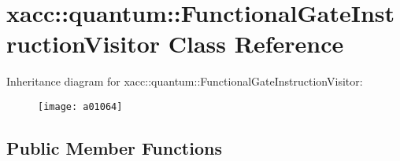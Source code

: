 \hypertarget{a01064}{}\section{xacc\+:\+:quantum\+:\+:Functional\+Gate\+Instruction\+Visitor Class Reference}
\label{a01064}
Inheritance diagram for xacc\+:\+:quantum\+:\+:Functional\+Gate\+Instruction\+Visitor\+:\begin{figure}[H]
\begin{center}
\leavevmode
\texttt{[image: a01064]}
\end{center}
\end{figure}
\subsection*{Public Member Functions}
